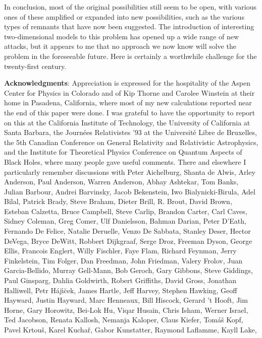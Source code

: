\documentclass[12pt]{article}
\begin{document}
	In conclusion, most of the original possibilities
\cite{Pag80} still seem to
be open, with various ones of these amplified or expanded into new
possibilities, such as the various types of remnants that have now
been
suggested.  The introduction of interesting two-dimensional models to
this
problem \cite{CGHS} has opened up a wide range of new attacks, but it
appears
to me that no approach we now know will solve the problem in the
foreseeable
future.  Here is certainly a worthwhile challenge for the
twenty-first century.

\pagebreak
\baselineskip 14.6pt
	{\bf Acknowledgments}:  Appreciation is expressed for the
hospitality of the Aspen Center for Physics in Colorado and of Kip
Thorne and Carolee Winstein at their home in Pasadena, California,
where most of my new calculations reported near the end of this paper
were done.  I was grateful to have the opportunity to report on this
at the California Institute of Technology, the University of
California at Santa Barbara, the Journ\'{e}es Relativistes '93 at the
Universit\'{e} Libre de Bruxelles, the 5th Canadian Conference on
General Relativity and Relativistic Astrophysics, and the Institute
for Theoretical Physics Conference on Quantum Aspects of Black Holes,
where many people gave useful comments.
There and elsewhere I particularly remember discussions with
Peter Aichelburg, Shanta de Alwis, Arley Anderson, Paul Anderson,
Warren Anderson, Abhay Ashtekar, Tom Banks, Julian Barbour,
Andrei Barvinsky, Jacob Bekenstein, Iwo Bialynicki-Birula, Adel
Bilal,
Patrick Brady, Steve Braham, Dieter Brill, R. Brout, David Brown,
Esteban Calzetta, Bruce Campbell, Steve Carlip, Brandon Carter,
Carl Caves, Sidney Coleman, Greg Comer, Ulf Danielsson,
Bahman Darian, Peter D'Eath, Fernando De Felice,
Natalie Deruelle, Venzo De Sabbata, Stanley Deser,
Hector DeVega, Bryce DeWitt, Robbert Dijkgraaf,
Serge Droz, Freeman Dyson, George Ellis, Francois Englert,
Willy Fischler, Faye Flam, Richard Feynman, Jerry Finkelstein,
Tim Folger, Dan Freedman, John Friedman, Valery Frolov,
Juan Garcia-Bellido, Murray Gell-Mann, Bob Geroch,
Gary Gibbons, Steve Giddings, Paul Ginsparg,
Dahlia Goldwirth, Robert Griffiths, David Gross,
Jonathan Halliwell, Petr H\'{a}j\'{\i}\u{c}ek, James Hartle,
Jeff Harvey, Stephen Hawking, Geoff Hayward, Justin Hayward,
Marc Henneaux, Bill Hiscock, Gerard 't Hooft, Jim Horne,
Gary Horowitz, Bei-Lok Hu, Viqar Husain, Chris Isham,
Werner Israel, Ted Jacobson, Renata Kallosh, Nemanja Kaloper,
Claus Kiefer, Tom\'{a}\v{s} Kopf, Pavel Krtou\v{s}, Karel Kucha\v{r},
Gabor Kunstatter, Raymond Laflamme, Kayll Lake,
\end{document}
